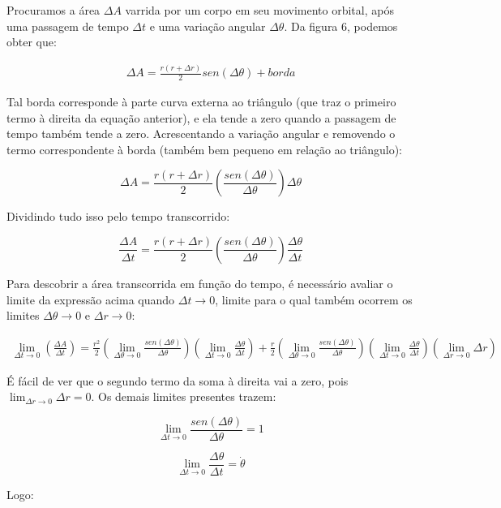 Procuramos a área $\Delta A$ varrida por um corpo em seu movimento orbital, após uma passagem de tempo $\Delta t$ e uma variação angular $\Delta \theta$. Da figura 6, podemos obter que:

\begin{eqnarray}
	\Delta A = \frac{r(r+\Delta r)}{2}sen(\Delta \theta) + borda\label{eq53}
\end{eqnarray}

Tal borda corresponde à parte curva externa ao triângulo (que traz o primeiro termo à direita da equação anterior), e ela tende a zero quando a passagem de tempo também tende a zero. Acrescentando a variação angular e removendo o termo correspondente à borda (também bem pequeno em relação ao triângulo):

\[
	\Delta A = \frac{r(r+\Delta r)}{2}\left(\frac{sen(\Delta \theta)}{\Delta \theta}\right)\Delta \theta
\]

Dividindo tudo isso pelo tempo transcorrido:

\[
    \frac{\Delta A}{\Delta t} = \frac{r(r+\Delta r)}{2}\left(\frac{sen(\Delta \theta)}{\Delta \theta}\right)\frac{\Delta \theta}{\Delta t}
\]

Para descobrir a área transcorrida em função do tempo, é necessário avaliar o limite da expressão acima quando $\Delta t \rightarrow 0$, limite para o qual também ocorrem os limites $\Delta \theta \rightarrow 0$ e $\Delta r \rightarrow 0$:

\begin{eqnarray}
	 \lim_{\Delta t \rightarrow 0}\left({\frac{\Delta A}{\Delta t}}\right) = \frac{r^2}{2}\left(\lim_{\Delta \theta \rightarrow 0}{\frac{sen(\Delta \theta)}{\Delta \theta}}\right)\left(\lim_{\Delta t \rightarrow 0}{\frac{\Delta \theta}{\Delta t}}\right) + \frac{r}{2}\left(\lim_{\Delta \theta \rightarrow 0}{\frac{sen(\Delta \theta)}{\Delta \theta}}\right)\left(\lim_{\Delta t \rightarrow 0}{\frac{\Delta \theta}{\Delta t}}\right)\left(\lim_{\Delta r \rightarrow 0}{\Delta r}\right) \label{eq54}
\end{eqnarray}

É fácil de ver que o segundo termo da soma à direita vai a zero, pois $\lim_{\Delta r \rightarrow 0}{\Delta r} = 0$. Os demais limites presentes trazem:

\[
	\lim_{\Delta t \rightarrow 0}{\frac{sen(\Delta \theta)}{\Delta \theta}} = 1
\]

\[
	\lim_{\Delta t \rightarrow 0}{\frac{\Delta \theta}{\Delta t}} = \dot{\theta}
\]

Logo:

